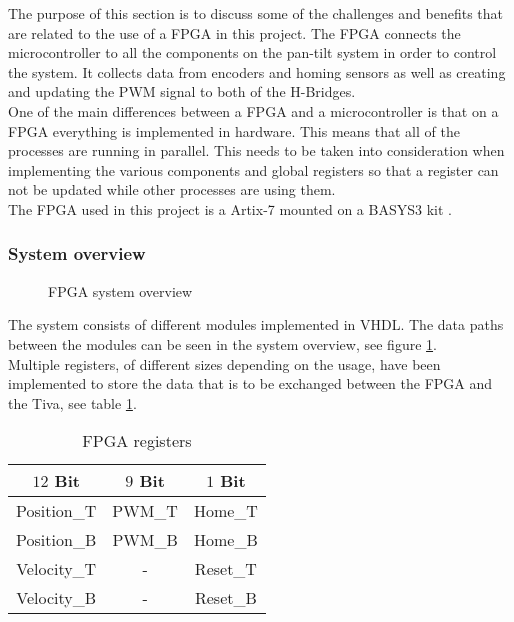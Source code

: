 \documentclass[../../../main]{subfiles}
\begin{document}
The purpose of this section is to discuss some of the challenges and benefits that are related to the use of a FPGA in this project.
The FPGA connects the microcontroller to all the components on the pan-tilt system in order to control the system. It collects data from encoders and homing sensors as well as creating and updating the PWM signal to both of the H-Bridges.
\\
One of the main differences between a FPGA and a microcontroller is that on a FPGA everything is implemented in hardware. This means that all of the processes are running in parallel.
This needs to be taken into consideration when implementing the various components and global registers so that a register can not be updated while other processes are using them.
\\
The FPGA used in this project is a Artix-7 mounted on a BASYS3 kit \cite{xilinx2019fpga}.
\subsubsection{System overview}%
\label{sub:system_overview}

\begin{figure}[H]
  \centering
  \def\svgwidth{\textwidth}
  
  \caption{FPGA system overview}
  \label{fig:FPGA_system_overview}
\end{figure}
The system consists of different modules implemented in VHDL.
The data paths between the modules can be seen in the system overview, see figure \ref{fig:FPGA_system_overview}.
\\
Multiple registers, of different sizes depending on the usage, have been implemented to store the data that is to be exchanged between the FPGA and the Tiva, see table \ref{table:FPGA_registers}.
\begin{table}[H]
\centering
\begin{tabular}{|c|c|c|}
\hline
\textbf{$12$ Bit} & \textbf{$9$ Bit} & \textbf{$1$ Bit} \\ \hline
Position\_T     & PWM\_T         & Home\_T        \\ \hline
Position\_B     & PWM\_B         & Home\_B        \\ \hline
Velocity\_T     & -              & Reset\_T       \\ \hline
Velocity\_B     & -              & Reset\_B       \\ \hline
\end{tabular}
\caption{FPGA registers}
\label{table:FPGA_registers}
\end{table}
\end{document}
